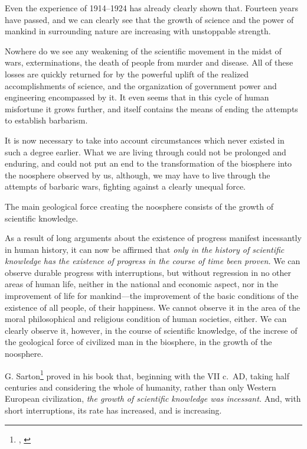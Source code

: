 Even the experience of 1914--1924 has already clearly shown that.  Fourteen
years have passed, and we can clearly see that the growth of science and the
power of mankind in surrounding nature are increasing with unstoppable
strength.

Nowhere do we see any weakening of the scientific movement in the midst of
wars, exterminations, the death of people from murder and disease.  All of
these losses are quickly returned for by the powerful uplift of the realized
accomplishments of science, and the organization of government power and
engineering encompassed by it.  It even seems that in this cycle of human
misfortune it grows further, and itself contains the means of ending the
attempts to establish barbarism.


It is now necessary to take into account circumstances which never existed in
such a degree earlier.  What we are living through could not be prolonged and
enduring, and could not put an end to the transformation of the biosphere into
the noosphere observed by us, although, we may have to live through the
attempts of barbaric wars, fighting against a clearly unequal force.


\Section %
The main geological force creating the noosphere consists of the growth of
scientific knowledge.

As a result of long arguments about the existence of progress manifest
incessantly in human history, it can now be affirmed that \emph{only in the
history of scientific knowledge has the existence of progress in the course of
time been proven.} We can observe durable progress with interruptions, but
without regression in no other areas of human life, neither in the national and
economic aspect, nor in the improvement of life for mankind---the improvement
of the basic conditions of the existence of all people, of their happiness.  We
cannot observe it in the area of the moral philosophical and religious
condition of human societies, either.  We can clearly observe it, however, in
the course of scientific knowledge, \ie{} of the increse of the geological
force of civilized man in the biosphere, in the growth of the noosphere.

G. Sarton\footnote{
	\cite{sarton1927introduction-v1},
	\cite{sarton1931introduction-v2}
}
proved in his book that, beginning with the VII c.\ AD, taking half centuries
and considering the whole of humanity, rather than only Western European
civilization, \emph{the growth of scientific knowledge was incessant.} And,
with short interruptions, its rate has increased, and is increasing.

